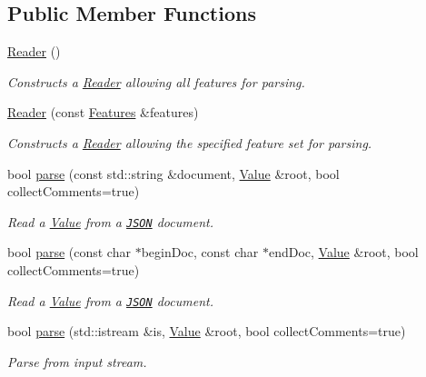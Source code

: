 \subsection*{Public Member Functions}
\begin{DoxyCompactItemize}
\item 
\hyperlink{classJson_1_1Reader_a0b3c4e24c8393354bab57a6ba3ffc27f}{Reader} ()
\begin{DoxyCompactList}\small\item\em Constructs a \hyperlink{classJson_1_1Reader}{Reader} allowing all features for parsing. \end{DoxyCompactList}\item 
\hyperlink{classJson_1_1Reader_a45f17831118337309180313e93ac33f8}{Reader} (const \hyperlink{classJson_1_1Features}{Features} \&features)
\begin{DoxyCompactList}\small\item\em Constructs a \hyperlink{classJson_1_1Reader}{Reader} allowing the specified feature set for parsing. \end{DoxyCompactList}\item 
bool \hyperlink{classJson_1_1Reader_af1da6c976ad1e96c742804c3853eef94}{parse} (const std\-::string \&document, \hyperlink{classJson_1_1Value}{Value} \&root, bool collect\-Comments=true)
\begin{DoxyCompactList}\small\item\em Read a \hyperlink{classJson_1_1Value}{Value} from a \href{http://www.json.org}{\tt J\-S\-O\-N} document. \end{DoxyCompactList}\item 
bool \hyperlink{classJson_1_1Reader_ac71ef2b64c7c27b062052e692af3fb32}{parse} (const char $\ast$begin\-Doc, const char $\ast$end\-Doc, \hyperlink{classJson_1_1Value}{Value} \&root, bool collect\-Comments=true)
\begin{DoxyCompactList}\small\item\em Read a \hyperlink{classJson_1_1Value}{Value} from a \href{http://www.json.org}{\tt J\-S\-O\-N} document. \end{DoxyCompactList}\item 
bool \hyperlink{classJson_1_1Reader_a8d0347e6b47343e4bc68be7ecdb9c4e9}{parse} (std\-::istream \&is, \hyperlink{classJson_1_1Value}{Value} \&root, bool collect\-Comments=true)
\begin{DoxyCompactList}\small\item\em Parse from input stream. \end{DoxyCompactList}\item 

\end{DoxyCompactItemize}
